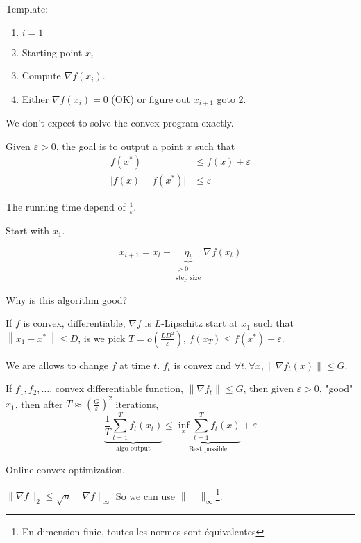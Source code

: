 Template:
\begin{enumerate}
    \item $i=1$
    \item Starting point $x_i$
    \item Compute $\nabla f(x_i)$.
    \item Either $\nabla f(x_i) = 0$ (OK) or figure out $x_{i+1}$ goto 2.
\end{enumerate}

We don't expect to solve the convex program exactly.

Given $\varepsilon > 0$, the goal is to output a point $x$ such that
\[
    \begin{aligned}
	    f(x^*) &\leqslant f(x)  + \varepsilon\\
	    \lvert f(x)-f(x^*)\rvert &\leqslant \varepsilon
    \end{aligned}
\]

The running time depend of $\frac{1}{\varepsilon}$.


Start with $x_1$.

\[
    x_{t+1} = x_t - \underbrace{\eta_t}_{\substack{>0\\\text{step size}}} \nabla f(x_t)
\]

Why is this algorithm good?


\begin{theorem}
    If $f$ is convex, differentiable, $\nabla f$ is $L$-Lipschitz start at $x_1$ such that $\left\lVert x_1-x^* \right\rVert \leqslant D$, is we pick $T = o\left( \frac{LD^2}{\varepsilon} \right)$, $f(x_T) \leqslant f(x^*) + \varepsilon$.
\end{theorem}

We are allows to change $f$ at time $t$. $f_t$ is convex and $\forall t, \forall x, \lVert \nabla f_t(x) \rVert \leqslant G$.

\begin{corollary}
    If $f_1, f_2,\ldots$, convex differentiable function, $\lVert \nabla f_t\rVert \leqslant G$, then given $\varepsilon > 0$, "good" $x_1$, then after $T \approx \left( \frac{G}{\varepsilon} \right)^2$ iterations, 
    \[
        \underbrace{\frac{1}{T} \sum\limits_{t=1}^T f_t(x_t)}_{\text{algo output}} \leqslant \underbrace{\inf\limits_x \sum_{t=1}^T f_t(x)}_{\text{Best possible}} + \varepsilon
    \]
\end{corollary}

Online convex optimization.


    $\lVert \nabla f \rVert_2 \leqslant \sqrt{n}\lVert \nabla f\rVert_\infty$ So we can use $\lVert\quad\rVert_\infty$\footnote{En dimension finie, toutes les normes sont équivalentes}.


